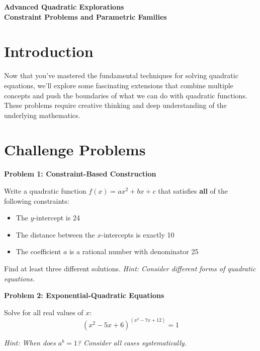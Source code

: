 \documentclass[12pt]{article}
\begin{document}
\begin{center}
\textbf{\Large Advanced Quadratic Explorations} \\
\textbf{\large Constraint Problems and Parametric Families} \\
\vspace{0.5cm}
\hspace{0.1\textwidth}
\end{center}

\vspace{0.5cm}

\section{Introduction}

Now that you've mastered the fundamental techniques for solving quadratic equations, we'll explore some fascinating extensions that combine multiple concepts and push the boundaries of what we can do with quadratic functions. These problems require creative thinking and deep understanding of the underlying mathematics.

\section{Challenge Problems}

\textbf{Problem 1: Constraint-Based Construction}

Write a quadratic function $f(x) = ax^2 + bx + c$ that satisfies \textbf{all} of the following constraints:
\begin{itemize}
\item The $y$-intercept is 24
\item The distance between the $x$-intercepts is exactly 10
\item The coefficient $a$ is a rational number with denominator 25
\end{itemize}

Find at least three different solutions. \textit{Hint: Consider different forms of quadratic equations.}

\vspace{4cm}

\textbf{Problem 2: Exponential-Quadratic Equations}

Solve for all real values of $x$:
$$(x^2 - 5x + 6)^{(x^2 - 7x + 12)} = 1$$

\textit{Hint: When does $a^b = 1$? Consider all cases systematically.}
\end{document}

